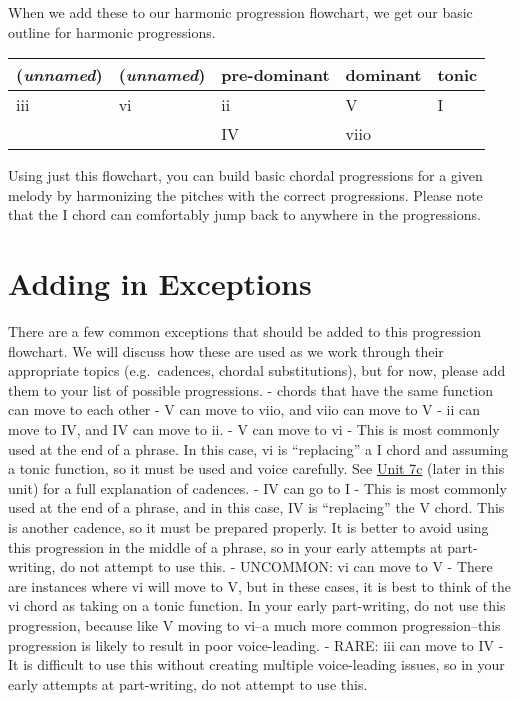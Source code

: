 \documentclass{book}
\begin{document}
When we add these to our harmonic progression flowchart, we get our basic
outline for harmonic progressions.

\begin{longtable}[]{@{}lllll@{}}
\toprule
(\emph{unnamed}) & (\emph{unnamed}) & pre-dominant & dominant & tonic \\
\midrule
\endhead
iii & vi & ii & V & I \\
& & IV & viio & \\
\bottomrule
\end{longtable}

Using just this flowchart, you can build basic chordal progressions for a
given melody by harmonizing the pitches with the correct progressions. Please
note that the I chord can comfortably jump back to anywhere in the
progressions.

\hypertarget{adding-in-exceptions}{%
\section{Adding in Exceptions}\label{adding-in-exceptions}}

There are a few common exceptions that should be added to this progression
flowchart. We will discuss how these are used as we work through their
appropriate topics (e.g.~cadences, chordal substitutions), but for now, please
add them to your list of possible progressions. - chords that have the same
function can move to each other - V can move to viio, and viio can move to V -
ii can move to IV, and IV can move to ii. - V can move to vi - This is most
commonly used at the end of a phrase. In this case, vi is ``replacing'' a I
chord and assuming a tonic function, so it must be used and voice carefully.
See \href{07-harmonic-functions/c1-cadences.html}{Unit 7c} (later in this
unit) for a full explanation of cadences. - IV can go to I - This is most
commonly used at the end of a phrase, and in this case, IV is ``replacing''
the V chord. This is another cadence, so it must be prepared properly. It is
better to avoid using this progression in the middle of a phrase, so in your
early attempts at part-writing, do not attempt to use this. - UNCOMMON: vi can
move to V - There are instances where vi will move to V, but in these cases,
it is best to think of the vi chord as taking on a tonic function. In your
early part-writing, do not use this progression, because like V moving to
vi--a much more common progression--this progression is likely to result in
poor voice-leading. - RARE: iii can move to IV - It is difficult to use this
without creating multiple voice-leading issues, so in your early attempts at
part-writing, do not attempt to use this.
\end{document}
